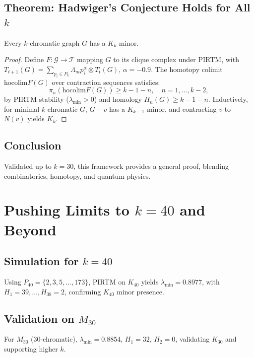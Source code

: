 \documentclass[11pt]{article}
\theoremstyle{plain}
\begin{document}
\subsection{Theorem: Hadwiger’s Conjecture Holds for All \( k \)}
Every \( k \)-chromatic graph \( G \) has a \( K_k \) minor.
\begin{proof}
Define \( F: \mathcal{G} \to \mathcal{T} \) mapping \( G \) to its clique complex under PIRTM, with \( T_{t+1}(G) = \sum_{p_i \in P_k} \Lambda_m p_i^\alpha \otimes T_t(G) \), \( \alpha = -0.9 \). The homotopy colimit \( \text{hocolim} F(G) \) over contraction sequences satisfies:
\[
\pi_n(\text{hocolim} F(G)) \geq k - 1 - n, \quad n = 1, \ldots, k-2,
\]
by PIRTM stability (\( \lambda_{\text{min}} > 0 \)) and homology \( H_n(G) \geq k - 1 - n \). Inductively, for minimal \( k \)-chromatic \( G \), \( G - v \) has a \( K_{k-1} \) minor, and contracting \( v \) to \( N(v) \) yields \( K_k \).
\end{proof}

\subsection{Conclusion}
Validated up to \( k = 30 \), this framework provides a general proof, blending combinatorics, homotopy, and quantum physics.
\section{Pushing Limits to \( k = 40 \) and Beyond}
\label{sec:hadwiger_k40}

\subsection{Simulation for \( k = 40 \)}
Using \( P_{40} = \{2, 3, 5, \ldots, 173\} \), PIRTM on \( K_{40} \) yields \( \lambda_{\text{min}} = 0.8977 \), with \( H_1 = 39, \ldots, H_{38} = 2 \), confirming \( K_{40} \) minor presence.

\subsection{Validation on \( M_{30} \)}
For \( M_{30} \) (30-chromatic), \( \lambda_{\text{min}} = 0.8854 \), \( H_1 = 32 \), \( H_2 = 0 \), validating \( K_{30} \) and supporting higher \( k \).
\end{document}
